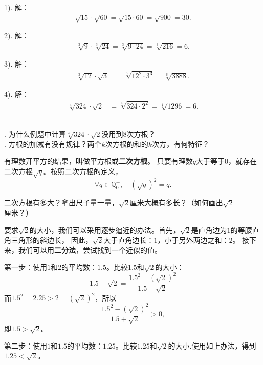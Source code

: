 \documentclass[12pt,UTF8,fontset=none]{ctexbook}
\begin{document}
\begin{so}
    1). 解： 
    \begin{align*}
        \sqrt{15}\cdot\sqrt{60} = \sqrt{15\cdot 60} = \sqrt{900} = 30. 
    \end{align*}

    2). 解：
    \begin{align*}
        \sqrt[3]{9}\cdot\sqrt[3]{24} = \sqrt[3]{9\cdot 24} = \sqrt[3]{216} = 6. 
    \end{align*}

    3). 解：
    \begin{align*}
        \sqrt[3]{12}\cdot\sqrt{3} &= \sqrt[6]{12^2\cdot 3^3} = \sqrt[6]{3888}. 
    \end{align*}

    4). 解：
    \begin{align*}
        \sqrt[4]{324}\cdot\sqrt{2} &= \sqrt[4]{324\cdot 2^2} = \sqrt[4]{1296} = 6. 
    \end{align*}
           
\end{so}

\begin{sk}
    \mbox{}\\
    . 为什么例题中计算$\sqrt[4]{324}\cdot\sqrt{2}$没用到$8$次方根？\\
    . 方根的加减有没有规律？两个$k$次方根的和的$k$次方，有何特征？
\end{sk}

有理数开平方的结果，叫做平方根或\textbf{二次方根}。
只要有理数$q$大于等于$0$，就存在二次方根$\sqrt{q}$。按照二次方根的定义，
$$\forall q\in\mathbb{Q}_0^+, \quad \left(\sqrt{q}\right)^2 = q.$$

二次方根有多大？拿出尺子量一量，$\sqrt{2}$厘米大概有多长？（如何画出$\sqrt{2}$厘米？）

要求$\sqrt{2}$的大小，我们可以采用逐步逼近的办法。首先，$\sqrt{2}$是直角边为$1$的等腰直角三角形的斜边长，
因此，$\sqrt{2}$大于直角边长：$1$，小于另外两边之和：$2$。
接下来，我们可以用\textbf{二分法}，尝试找到一个近似的值。

第一步：使用$1$和$2$的平均数：$1.5$。比较$1.5$和$\sqrt{2}$的大小：
$$ 1.5 - \sqrt{2} = \frac{1.5^2 - \left(\sqrt{2}\right)^2}{1.5 + \sqrt{2}} $$
而$1.5^2 = 2.25 > 2 = \left(\sqrt{2}\right)^2$，所以
$$ \frac{1.5^2 - \left(\sqrt{2}\right)^2}{1.5 + \sqrt{2}} > 0,$$
即$1.5 > \sqrt{2}$。

第二步：使用$1$和$1.5$的平均数：$1.25$。比较$1.25$和$\sqrt{2}$的大小.使用如上办法，得到
$1.25 < \sqrt{2}$。
\end{document}
